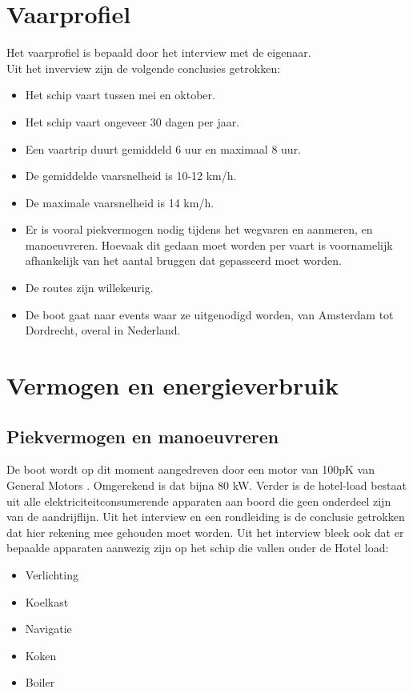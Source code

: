 \section{Vaarprofiel}
Het vaarprofiel is bepaald door het interview met de eigenaar. \\
\noindent Uit het inverview \cite{vanbaalen2026interview} zijn de volgende conclusies getrokken:
\begin{itemize}
    \item Het schip vaart tussen mei en oktober.
    \item Het schip vaart ongeveer 30 dagen per jaar.
    \item Een vaartrip duurt gemiddeld 6 uur en maximaal 8 uur.
    \item De gemiddelde vaarsnelheid is 10-12 km/h.
    \item De maximale vaarsnelheid is 14 km/h.
    \item Er is vooral piekvermogen nodig tijdens het wegvaren en aanmeren, en manoeuvreren. Hoevaak dit gedaan moet worden per vaart is voornamelijk afhankelijk van het aantal bruggen dat gepasseerd moet worden.
    \item De routes zijn willekeurig. 
    \item De boot gaat naar events waar ze uitgenodigd worden, van Amsterdam tot Dordrecht, overal in Nederland.
\end{itemize}


\section{Vermogen en energieverbruik}
\subsection{Piekvermogen en manoeuvreren}

De boot wordt op dit moment aangedreven door een motor van 100pK van General Motors \cite{Jansje}. Omgerekend is dat bijna 80 kW. Verder is de hotel-load bestaat uit alle elektriciteitconsumerende apparaten aan boord die geen onderdeel zijn van de aandrijflijn.
Uit het interview en een rondleiding is de conclusie getrokken dat hier rekening mee gehouden moet worden.
\noindent Uit het interview bleek ook dat er bepaalde apparaten aanwezig zijn op het schip die vallen onder de Hotel load:
\begin{itemize}
    \item Verlichting
    \item Koelkast
    \item Navigatie
    \item Koken
    \item Boiler
\end{itemize}

